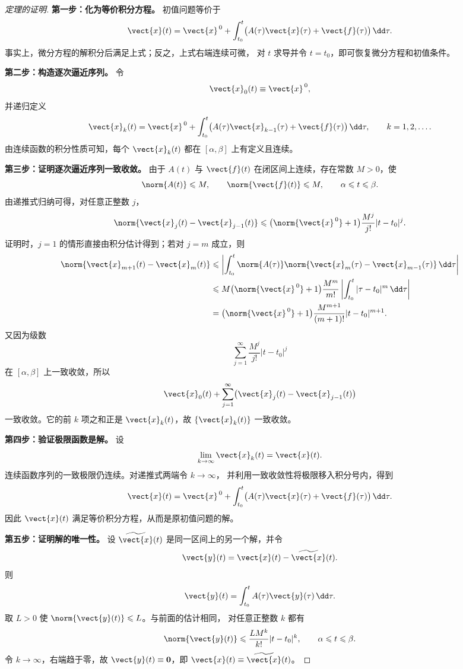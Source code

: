 \begin{proof}[定理的证明]
	\textbf{第一步：化为等价积分方程。}
	初值问题等价于
	\[
		\vect{x}(t)
		=\vect{x}^{\,0}
		+\int_{t_0}^{t}
		\bigl(A(\tau)\vect{x}(\tau)+\vect{f}(\tau)\bigr)\,\dd\tau.
	\]
	事实上，微分方程的解积分后满足上式；反之，上式右端连续可微，
	对 $t$ 求导并令 $t=t_0$，即可恢复微分方程和初值条件。

	\textbf{第二步：构造逐次逼近序列。}
	令
	\[
		\vect{x}_0(t)\equiv\vect{x}^{\,0},
	\]
	并递归定义
	\[
		\vect{x}_k(t)
		=\vect{x}^{\,0}
		+\int_{t_0}^{t}
		\bigl(A(\tau)\vect{x}_{k-1}(\tau)
		+\vect{f}(\tau)\bigr)\,\dd\tau,
		\qquad k=1,2,\ldots.
	\]
	由连续函数的积分性质可知，每个 $\vect{x}_k(t)$ 都在
	$[\alpha,\beta]$ 上有定义且连续。

	\textbf{第三步：证明逐次逼近序列一致收敛。}
	由于 $A(t)$ 与 $\vect{f}(t)$ 在闭区间上连续，存在常数 $M>0$，使
	\[
		\norm{A(t)}\leqslant M,
		\qquad
		\norm{\vect{f}(t)}\leqslant M,
		\qquad \alpha\leqslant t\leqslant\beta.
	\]
	由递推式归纳可得，对任意正整数 $j$，
	\[
		\norm{\vect{x}_j(t)-\vect{x}_{j-1}(t)}
		\leqslant
		\bigl(\norm{\vect{x}^{\,0}}+1\bigr)
		\dfrac{M^j}{j!}|t-t_0|^j.
	\]
	证明时，$j=1$ 的情形直接由积分估计得到；若对 $j=m$ 成立，则
	\[
		\begin{aligned}
		\norm{\vect{x}_{m+1}(t)-\vect{x}_m(t)}
		&\leqslant
		\left|
		\int_{t_0}^{t}
		\norm{A(\tau)}
		\norm{\vect{x}_m(\tau)-\vect{x}_{m-1}(\tau)}
		\,\dd\tau
		\right|\\
		&\leqslant
		M\bigl(\norm{\vect{x}^{\,0}}+1\bigr)
		\dfrac{M^m}{m!}
		\left|
		\int_{t_0}^{t}|\tau-t_0|^m\,\dd\tau
		\right|\\
		&=
		\bigl(\norm{\vect{x}^{\,0}}+1\bigr)
		\dfrac{M^{m+1}}{(m+1)!}|t-t_0|^{m+1}.
		\end{aligned}
	\]
	又因为级数
	\[
		\sum_{j=1}^{\infty}\dfrac{M^j}{j!}|t-t_0|^j
	\]
	在 $[\alpha,\beta]$ 上一致收敛，所以
	\[
		\vect{x}_0(t)
		+\sum_{j=1}^{\infty}
		\bigl(\vect{x}_j(t)-\vect{x}_{j-1}(t)\bigr)
	\]
	一致收敛。它的前 $k$ 项之和正是 $\vect{x}_k(t)$，故
	$\{\vect{x}_k(t)\}$ 一致收敛。

	\textbf{第四步：验证极限函数是解。}
	设
	\[
		\lim_{k\to\infty}\vect{x}_k(t)=\vect{x}(t).
	\]
	连续函数序列的一致极限仍连续。对递推式两端令 $k\to\infty$，
	并利用一致收敛性将极限移入积分号内，得到
	\[
		\vect{x}(t)
		=\vect{x}^{\,0}
		+\int_{t_0}^{t}
		\bigl(A(\tau)\vect{x}(\tau)+\vect{f}(\tau)\bigr)\,\dd\tau.
	\]
	因此 $\vect{x}(t)$ 满足等价积分方程，从而是原初值问题的解。

	\textbf{第五步：证明解的唯一性。}
	设 $\widetilde{\vect{x}}(t)$ 是同一区间上的另一个解，并令
	\[
		\vect{y}(t)=\vect{x}(t)-\widetilde{\vect{x}}(t).
	\]
	则
	\[
		\vect{y}(t)
		=\int_{t_0}^{t}A(\tau)\vect{y}(\tau)\,\dd\tau.
	\]
	取 $L>0$ 使 $\norm{\vect{y}(t)}\leqslant L$。与前面的估计相同，
	对任意正整数 $k$ 都有
	\[
		\norm{\vect{y}(t)}
		\leqslant
		\dfrac{LM^k}{k!}|t-t_0|^k,
		\qquad \alpha\leqslant t\leqslant\beta.
	\]
	令 $k\to\infty$，右端趋于零，故
	$\vect{y}(t)\equiv\boldsymbol{0}$，即
	$\vect{x}(t)\equiv\widetilde{\vect{x}}(t)$。
\end{proof}

